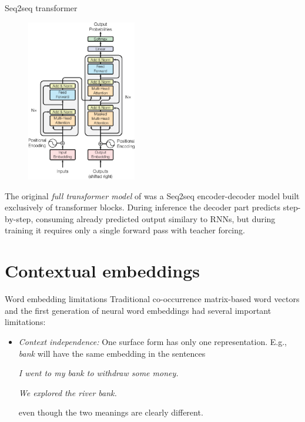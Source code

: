 \documentclass[style=upen, size=14pt]{powerdot}
\newcommand{\gold}{\color{arany}}
\theoremstyle{definition}
\begin{document}
\begin{slide}[toc=Seq2seq]{Seq2seq transformer}
    \begin{figure}
    \includegraphics[width=4.8cm]{figures/transformer_full.eps}
  \end{figure}
  The original \emph{full transformer model} of \citep{vaswani2017attention} was
  a Seq2seq encoder-decoder model built exclusively of transformer blocks.
  During inference the decoder part predicts step-by-step, consuming already
  predicted output similary to RNNs, but during training it requires only a
  single forward pass with teacher forcing.
\end{slide}

\section{Contextual embeddings}

\begin{slide}[toc=Embedding limitations]{Word embedding limitations}
  Traditional co-occurrence matrix-based word vectors and the first generation
  of neural word embeddings had several important limitations:
  \begin{itemize}
  \item \emph{\gold Context independence:} One surface form has only one
    representation. E.g., \emph{bank} will have the same embedding in the
    sentences\medskip

    \emph{I went to my bank to withdraw some money.}\medskip


    \emph{We explored the river bank.}\medskip

    even though the two meanings are clearly different.
  \end{itemize}
\end{slide}
\end{document}
